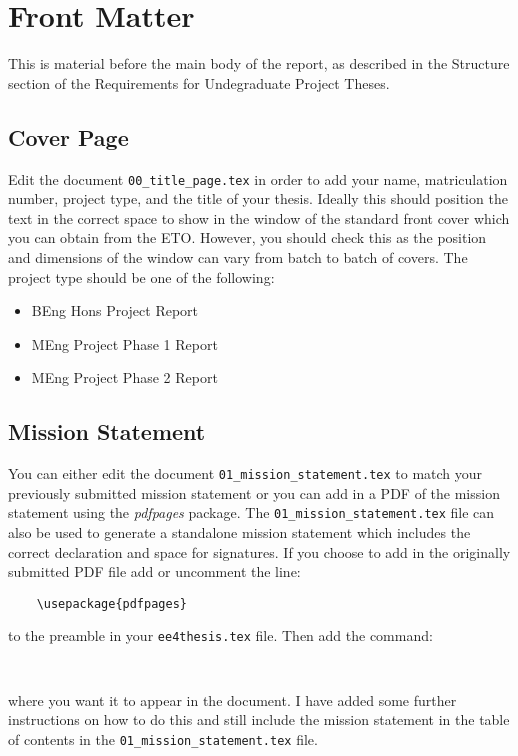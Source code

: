 \documentclass[a4paper,12pt]{article}
\begin{document}
\section{Front Matter}

This is material before the main body of the report, as described in the
Structure section of the Requirements for Undegraduate Project Theses.

\subsection{Cover Page}

Edit the document \verb+00_title_page.tex+ in order to add your name,
matriculation number, project type, and the title of your
thesis.  Ideally this should position the text in the correct space to show in
the window of the standard front cover which you can obtain from the ETO.
However, you should check this as the position and dimensions of the window can
vary from batch to batch of covers.  The project type should be one of the
following:

\begin{itemize}
	\item BEng Hons Project Report
	\item MEng Project Phase 1 Report
	\item MEng Project Phase 2 Report
\end{itemize}

\subsection{Mission Statement}

You can either edit the document \verb+01_mission_statement.tex+ to match your previously
submitted mission statement or you can add in a PDF of the mission statement using the \emph{pdfpages} package.  The \verb+01_mission_statement.tex+ file can also be used to generate a standalone mission statement which includes the correct declaration and space for signatures.  If you choose to add in the originally submitted PDF file add or uncomment the line:
\begin{verbatim}
    \usepackage{pdfpages}
\end{verbatim}
to the preamble in your \verb+ee4thesis.tex+ file.  Then add the command:
\begin{verbatim}
    
\end{verbatim}
where you want it to appear in the document. I have added some further instructions on how to do this and still include the mission statement in the table of contents in the \verb+01_mission_statement.tex+ file.
\end{document}
